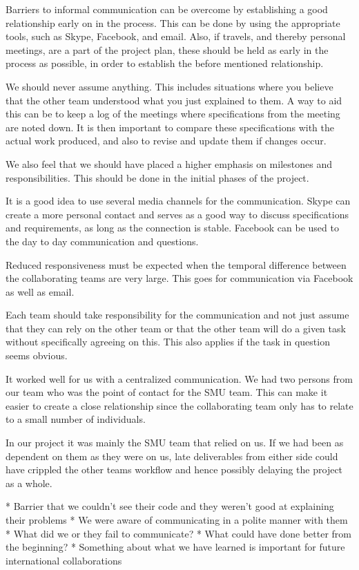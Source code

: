 Barriers to informal communication can be overcome by establishing a good relationship early on in the process. This can be done by using the appropriate tools, such as Skype, Facebook, and email. Also, if travels, and thereby personal meetings, are a part of the project plan, these should be held as early in the process as possible, in order to establish the before mentioned relationship.

We should never assume anything. This includes situations where you believe that the other team understood what you just explained to them. A way to aid this can be to keep a log of the meetings where specifications from the meeting are noted down. It is then important to compare these specifications with the actual work produced, and also to revise and update them if changes occur.

We also feel that we should have placed a higher emphasis on milestones and responsibilities. This should be done in the initial phases of the project.

It is a good idea to use several media channels for the communication. Skype can create a more personal contact and serves as a good way to discuss specifications and requirements, as long as the connection is stable. Facebook can be used to the day to day communication and questions.

Reduced responsiveness must be expected when the temporal difference between the collaborating teams are very large. This goes for communication via Facebook as well as email.

Each team should take responsibility for the communication and not just assume that they can rely on the other team or that the other team will do a given task without specifically agreeing on this. This also applies if the task in question seems obvious.

It worked well for us with a centralized communication. We had two persons from our team who was the point of contact for the SMU team. This can make it easier to create a close relationship since the collaborating team only has to relate to a small number of individuals.

In our project it was mainly the SMU team that relied on us. If we had been as dependent on them as they were on us, late deliverables from either side could have crippled the other teams workflow and hence possibly delaying the project as a whole.





* Barrier that we couldn't see their code and they weren't good at explaining their problems
* We were aware of communicating in a polite manner with them
* What did we or they fail to communicate?
* What could have done better from the beginning?
* Something about what we have learned is important for future international collaborations


